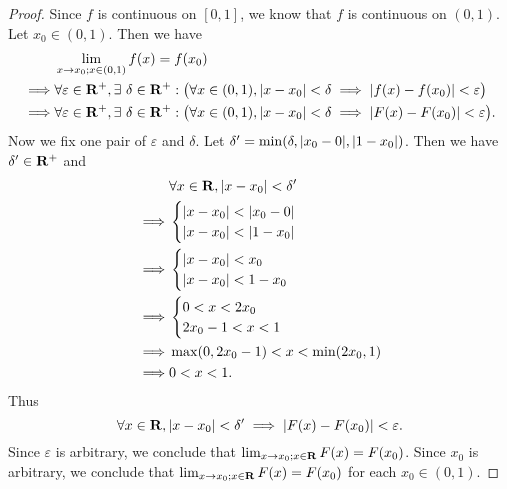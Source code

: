 \begin{proof}
  Since \(f\) is continuous on \([0, 1]\), we know that \(f\) is continuous on \((0, 1)\).
  Let \(x_0 \in (0, 1)\).
  Then we have
  \begin{align*}
             & \lim_{x \to x_0 ; x \in (0, 1)} f(x) = f(x_0)                                                                                                               \\
    \implies & \forall \varepsilon \in \mathbf{R}^+, \exists\ \delta \in \mathbf{R}^+ : \big(\forall x \in (0, 1), \left\lvert x - x_0\right\rvert < \delta \implies \left\lvert f(x) - f(x_0)\right\rvert < \varepsilon\big)  \\
    \implies & \forall \varepsilon \in \mathbf{R}^+, \exists\ \delta \in \mathbf{R}^+ : \big(\forall x \in (0, 1), \left\lvert x - x_0\right\rvert < \delta \implies \left\lvert F(x) - F(x_0)\right\rvert < \varepsilon\big).
  \end{align*}
  Now we fix one pair of \(\varepsilon\) and \(\delta\).
  Let \(\delta' = \min(\delta, \abs{x_0 - 0}, \abs{1 - x_0})\).
  Then we have \(\delta' \in \mathbf{R}^+\) and
  \begin{align*}
             & \forall x \in \mathbf{R}, \left\lvert x - x_0\right\rvert < \delta' \\
    \implies & \begin{cases}
                 \left\lvert x - x_0\right\rvert < \left\lvert x_0 - 0\right\rvert \\
                 \left\lvert x - x_0\right\rvert < \left\lvert1 - x_0\right\rvert
               \end{cases}             \\
    \implies & \begin{cases}
                 \left\lvert x - x_0\right\rvert < x_0 \\
                 \left\lvert x - x_0\right\rvert < 1 - x_0
               \end{cases}                    \\
    \implies & \begin{cases}
                 0 < x < 2x_0 \\
                 2x_0 - 1 < x < 1
               \end{cases}                           \\
    \implies & \max(0, 2x_0 - 1) < x < \min(2x_0, 1)     \\
    \implies & 0 < x < 1.
  \end{align*}
  Thus
  \[
    \forall x \in \mathbf{R}, \left\lvert x - x_0\right\rvert < \delta' \implies \left\lvert F(x) - F(x_0)\right\rvert < \varepsilon.
  \]
  Since \(\varepsilon\) is arbitrary, we conclude that \(\lim_{x \to x_0 ; x \in \mathbf{R}} F(x) = F(x_0)\).
  Since \(x_0\) is arbitrary, we conclude that \(\lim_{x \to x_0 ; x \in \mathbf{R}} F(x) = F(x_0)\) for each \(x_0 \in (0, 1)\).


\end{proof}
